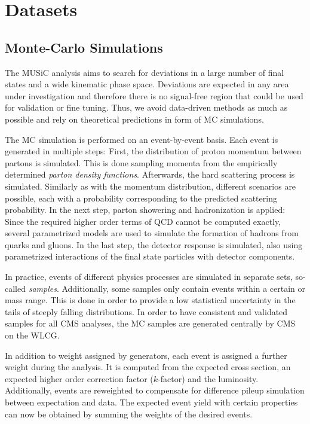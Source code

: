 
\chapter{Datasets}
\section{Monte-Carlo Simulations}
The \ac{MUSiC} analysis aims to search for deviations in a large number of final states and a wide kinematic phase space. Deviations are expected in any area under investigation and therefore there is no signal-free region that could be used for validation or fine tuning. Thus, we avoid data-driven methods as much as possible and rely on theoretical predictions in form of \acl{MC} simulations.

The \acl{MC} simulation is performed on an event-by-event basis. Each event is generated in multiple steps\cite{Webber:PartonshowerMonte}: First, the distribution of proton momentum between partons is simulated. This is done sampling momenta from the empirically determined \emph{parton density functions}.
Afterwards, the hard scattering process is simulated. Similarly as with the momentum distribution, different scenarios are possible, each with a probability corresponding to the predicted scattering probability. In the next step, parton showering and hadronization is applied: Since the required higher order terms of \ac{QCD} cannot be computed exactly, several parametrized models are used to simulate the formation of hadrons from quarks and gluons. In the last step, the detector response is simulated, also using parametrized interactions of the final state particles with detector components.

In practice, events of different physics processes are simulated in separate sets, so-called \emph{samples}. 
Additionally, some samples only contain events within a certain \pT or mass range. This is done in order to provide a low statistical uncertainty in the tails of steeply falling distributions.
In order to have consistent and validated samples for all \ac{CMS} analyses, the \ac{MC} samples are generated centrally by \ac{CMS} on the \ac{WLCG}\cite{TWiki:GeneratorValidation}.

In addition to weight assigned by generators, each event is assigned a further weight during the analysis. It is computed from the expected cross section, an expected higher order correction factor ($k$-factor) and the luminosity. 
Additionally, events are reweighted to compensate for difference pileup simulation between expectation and data. 
The expected event yield with certain properties can now be obtained by summing the weights of the desired events.

